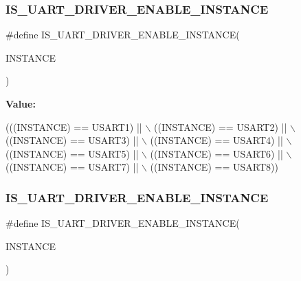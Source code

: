 \subsubsection{\texorpdfstring{I\+S\+\_\+\+U\+A\+R\+T\+\_\+\+D\+R\+I\+V\+E\+R\+\_\+\+E\+N\+A\+B\+L\+E\+\_\+\+I\+N\+S\+T\+A\+N\+CE}{IS\_UART\_DRIVER\_ENABLE\_INSTANCE}\hspace{0.1cm}{\footnotesize\ttfamily [12/13]}}
{\footnotesize\ttfamily \#define I\+S\+\_\+\+U\+A\+R\+T\+\_\+\+D\+R\+I\+V\+E\+R\+\_\+\+E\+N\+A\+B\+L\+E\+\_\+\+I\+N\+S\+T\+A\+N\+CE(\begin{DoxyParamCaption}\item[{}]{I\+N\+S\+T\+A\+N\+CE }\end{DoxyParamCaption})}

{\bfseries Value\+:}
\begin{DoxyCode}
(((INSTANCE) == USART1) || \(\backslash\)
                                                  ((INSTANCE) == USART2) || \(\backslash\)
                                                  ((INSTANCE) == USART3) || \(\backslash\)
                                                  ((INSTANCE) == USART4) || \(\backslash\)
                                                  ((INSTANCE) == USART5) || \(\backslash\)
                                                  ((INSTANCE) == USART6) || \(\backslash\)
                                                  ((INSTANCE) == USART7) || \(\backslash\)
                                                  ((INSTANCE) == USART8))
\end{DoxyCode}
\mbox{\label{group___exported__macro_ga98f122ffe4d77f03a13f682301e2d596}} 
\subsubsection{\texorpdfstring{I\+S\+\_\+\+U\+A\+R\+T\+\_\+\+D\+R\+I\+V\+E\+R\+\_\+\+E\+N\+A\+B\+L\+E\+\_\+\+I\+N\+S\+T\+A\+N\+CE}{IS\_UART\_DRIVER\_ENABLE\_INSTANCE}\hspace{0.1cm}{\footnotesize\ttfamily [13/13]}}
{\footnotesize\ttfamily \#define I\+S\+\_\+\+U\+A\+R\+T\+\_\+\+D\+R\+I\+V\+E\+R\+\_\+\+E\+N\+A\+B\+L\+E\+\_\+\+I\+N\+S\+T\+A\+N\+CE(\begin{DoxyParamCaption}\item[{}]{I\+N\+S\+T\+A\+N\+CE }\end{DoxyParamCaption})}

